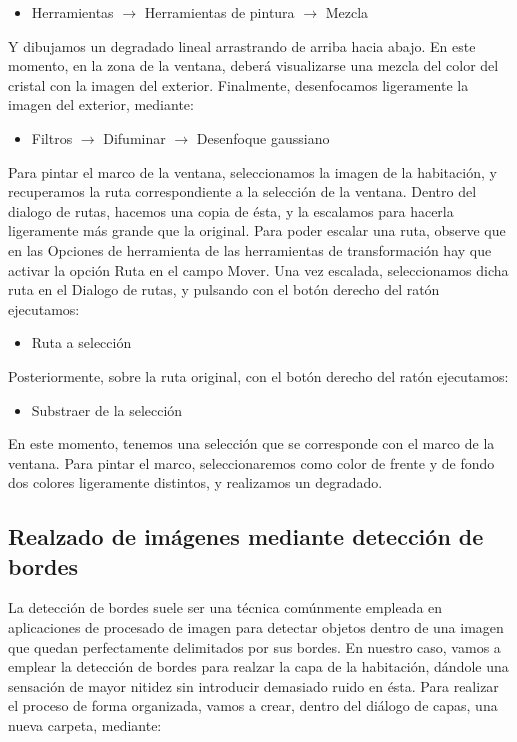 \documentclass[es,practica]{uah}
\begin{document}
\begin{itemize}
	\item Herramientas $\rightarrow$ Herramientas de pintura $\rightarrow$ Mezcla
\end{itemize}

Y dibujamos un degradado lineal arrastrando de arriba hacia abajo. En este momento, en la zona de la ventana, deberá visualizarse una mezcla del color del cristal con la imagen del exterior. Finalmente, desenfocamos ligeramente la imagen del exterior, mediante:

\begin{itemize}
	\item Filtros $\rightarrow$ Difuminar $\rightarrow$ Desenfoque gaussiano
\end{itemize}

Para pintar el marco de la ventana, seleccionamos la imagen de la habitación, y recuperamos la ruta correspondiente a la selección de la ventana. Dentro del dialogo de rutas, hacemos una copia de ésta, y la escalamos para hacerla ligeramente más grande que la original. Para poder escalar una ruta, observe que en las Opciones de herramienta de las herramientas de transformación hay que activar la opción Ruta en el campo Mover. Una vez escalada, seleccionamos dicha ruta en el Dialogo de rutas, y pulsando con el botón derecho del ratón ejecutamos:

\begin{itemize}
	\item Ruta a selección
\end{itemize}

Posteriormente, sobre la ruta original, con el botón derecho del ratón ejecutamos:
\begin{itemize}
	\item Substraer de la selección
\end{itemize}

En este momento, tenemos una selección que se corresponde con el marco de la ventana. Para pintar el marco, seleccionaremos como color de frente y de fondo dos colores ligeramente distintos, y realizamos un degradado.

\subsection{Realzado de imágenes mediante detección de bordes}

La detección de bordes suele ser una técnica comúnmente empleada en aplicaciones de procesado de imagen para detectar objetos dentro de una imagen que quedan perfectamente delimitados por sus bordes. En nuestro caso, vamos a emplear la detección de bordes para realzar la capa de la habitación, dándole una sensación de mayor nitidez sin introducir demasiado ruido en ésta. Para realizar el proceso de forma organizada, vamos a crear, dentro del diálogo de capas, una nueva carpeta, mediante:
\end{document}
